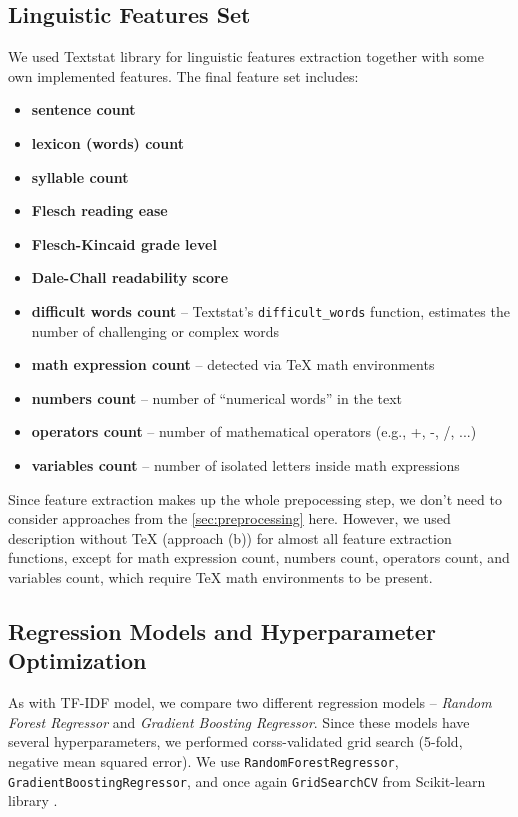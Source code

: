 \documentclass[runningheads]{llncs}
\begin{document}
\subsection{Linguistic Features Set}

We used Textstat library \cite{textstat} for linguistic features extraction together with some own implemented features. The final feature set includes:

\begin{itemize}
    \item \textbf{sentence count}
    \item \textbf{lexicon (words) count}
    \item \textbf{syllable count}
    \item \textbf{Flesch reading ease}
    \item \textbf{Flesch-Kincaid grade level}
    \item \textbf{Dale-Chall readability score}
    \item \textbf{difficult words count} -- Textstat's \texttt{difficult\_words} function, estimates the number of challenging or complex words
    \item \textbf{math expression count} -- detected via \TeX{} math environments
    \item \textbf{numbers count} -- number of ``numerical words'' in the text
    \item \textbf{operators count} -- number of mathematical operators (e.g., +, -, /, ...)
    \item \textbf{variables count} -- number of isolated letters inside math expressions
\end{itemize}

Since feature extraction makes up the whole prepocessing step, we don't need to consider approaches from the \cref{sec:preprocessing} here. However, we used description without \TeX{} (approach (b)) for almost all feature extraction functions, except for math expression count, numbers count, operators count, and variables count, which require \TeX{} math environments to be present.

\subsection{Regression Models and Hyperparameter Optimization}

As with TF-IDF model, we compare two different regression models -- \textit{Random Forest Regressor} and \textit{Gradient Boosting Regressor}. Since these models have several hyperparameters, we performed corss-validated grid search (5-fold, negative mean squared error). We use \texttt{RandomForestRegressor}, \texttt{GradientBoostingRegressor}, and once again \texttt{GridSearchCV} from Scikit-learn library \cite{scikit-learn}.
\end{document}
